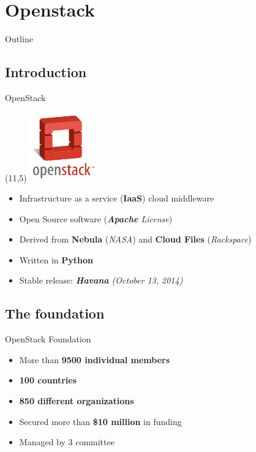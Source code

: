 
\section{Openstack}
\begin{frame}{Outline}
\end{frame}
\subsection{Introduction}

\begin{frame}{OpenStack}
  \begin{textblock}{}(11,5)
      \includegraphics[width=8em]{img/openstack-logo512}
  \end{textblock}
  \begin{itemize}
    \item Infrastructure as a service (\textbf{IaaS}) cloud middleware
      \medskip
    \item Open Source software (\textsl{\textbf{Apache} License})
      \medskip
    \item Derived from \textbf{Nebula} (\textsl{NASA}) and \textbf{Cloud Files} (\textsl{Rackspace})
      \medskip
    \item Written in \textbf{Python}
      \medskip
    \item Stable release: \textsl{\textbf{Havana} (October 13, 2014)}
      \medskip
  \end{itemize}
\end{frame}

\subsection{The foundation}
\begin{frame}{OpenStack Foundation}
  \begin{itemize}
    \item More than \textbf{9500 individual members}
      \medskip
    \item \textbf{100 countries}
      \medskip
    \item \textbf{850 different organizations}
      \medskip
    \item Secured more than \textbf{\$10 million} in funding
      \medskip
    \item Managed by 3 committee
  \end{itemize}
\end{frame}

